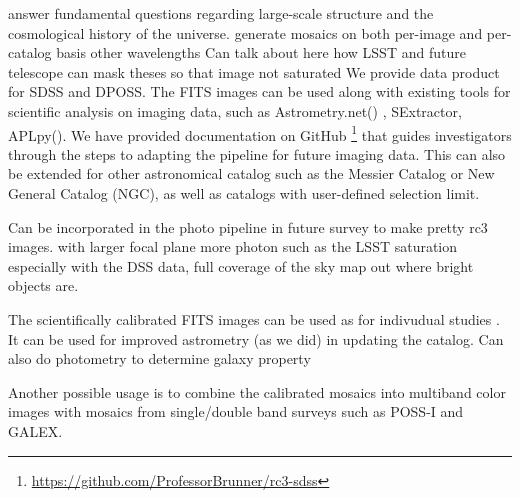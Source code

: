 \documentclass[5p]{elsarticle}
\begin{document}
answer fundamental questions regarding large-scale structure and the cosmological history of the universe.
generate mosaics on both per-image and per-catalog basis
other wavelengths
Can talk about here how LSST and future telescope can mask theses so that image not saturated
We provide data product for SDSS and DPOSS.
The FITS images can be used along with existing tools for scientific analysis on imaging data, such as Astrometry.net(\citet{astrometry.net}) , SExtractor, APLpy(\citet{aplpy}). We have provided documentation on GitHub \footnote{\url{https://github.com/ProfessorBrunner/rc3-sdss}} that guides investigators through the steps to adapting the pipeline for future imaging data. This can also be extended for other astronomical catalog such as the Messier Catalog or New General Catalog (NGC), as well as catalogs with user-defined selection limit. %

Can be incorporated in the photo pipeline in future survey to make pretty rc3 images.
with larger focal plane 
more photon
such as the LSST
saturation
especially with the DSS data, full coverage of the sky
map out where bright objects are. 


The scientifically calibrated FITS images can be used as for indivudual studies . It can be used for improved astrometry (as we did) in updating the catalog. Can also do photometry to determine galaxy property

Another possible usage is to combine the calibrated mosaics into multiband color images with mosaics from single/double band surveys such as POSS-I and GALEX.
\end{document}
